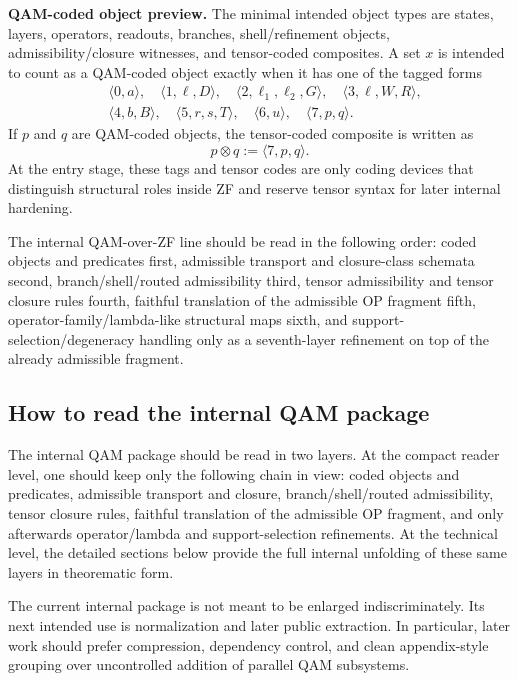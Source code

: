 \begin{remark}
\textbf{QAM-coded object preview.} The minimal intended object types are states, layers, operators, readouts, branches, shell/refinement objects, admissibility/closure witnesses, and tensor-coded composites. A set $x$ is intended to count as a QAM-coded object exactly when it has one of the tagged forms
\[
\begin{aligned}
&\langle 0,a\rangle,\quad
\langle 1,\ell,D\rangle,\quad
\langle 2,\ell_1,\ell_2,G\rangle,\quad
\langle 3,\ell,W,R\rangle,\\
&\langle 4,b,B\rangle,\quad
\langle 5,r,s,T\rangle,\quad
\langle 6,u\rangle,\quad
\langle 7,p,q\rangle.
\end{aligned}
\]
If $p$ and $q$ are QAM-coded objects, the tensor-coded composite is written as
\[
p \otimes q := \langle 7,p,q\rangle.
\]
At the entry stage, these tags and tensor codes are only coding devices that distinguish structural roles inside ZF and reserve tensor syntax for later internal hardening.
\end{remark}

\begin{remark}
The internal QAM-over-ZF line should be read in the following order: coded objects and predicates first, admissible transport and closure-class schemata second, branch/shell/routed admissibility third, tensor admissibility and tensor closure rules fourth, faithful translation of the admissible OP fragment fifth, operator-family/lambda-like structural maps sixth, and support-selection/degeneracy handling only as a seventh-layer refinement on top of the already admissible fragment.
\end{remark}

\subsection*{How to read the internal QAM package}
The internal QAM package should be read in two layers. At the compact reader level, one should keep only the following chain in view: coded objects and predicates, admissible transport and closure, branch/shell/routed admissibility, tensor closure rules, faithful translation of the admissible OP fragment, and only afterwards operator/lambda and support-selection refinements. At the technical level, the detailed sections below provide the full internal unfolding of these same layers in theorematic form.

\begin{remark}
The current internal package is not meant to be enlarged indiscriminately. Its next intended use is normalization and later public extraction. In particular, later work should prefer compression, dependency control, and clean appendix-style grouping over uncontrolled addition of parallel QAM subsystems.
\end{remark}

